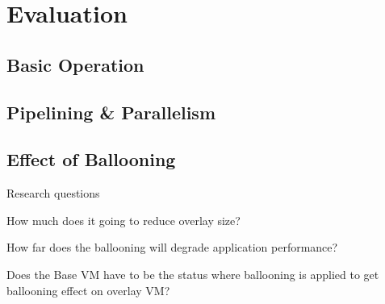 \section{Evaluation}
\label{sec:evaluation}

\subsection{Basic Operation}
\label{sec:basic_operation}


\subsection{Pipelining \& Parallelism}
\label{sec:pipelining}


\subsection{Effect of Ballooning}
\label{sec:ballooining}

Research questions
\begin{smitemize}
\item{How much does it going to reduce overlay size?}
\item{How far does the ballooning will degrade application performance?}
\item{Does the Base VM have to be the status where ballooning is 
applied to get ballooning effect on overlay VM?}
\end{smitemize}





